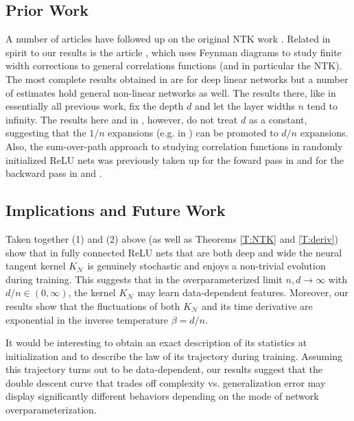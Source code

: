 \documentclass[11pt, reqno]{amsart}
\newcommand{\gives}{\ensuremath{\rightarrow}}
\newcommand{\mN}{\mathcal N}
\begin{document}
\subsection{Prior Work}
A number of articles \cite{bietti2019inductive,dyer2018asymptotics,lee2019wide,yang2019scaling} have followed up on the original NTK work \cite{jacot2018neural}. Related in spirit to our results is the article \cite{dyer2018asymptotics}, which uses Feynman diagrams to study finite width corrections to general correlations functions (and in particular the NTK). The most complete results obtained in \cite{dyer2018asymptotics} are for deep linear networks but a number of estimates hold general non-linear networks as well. The results there, like in essentially all previous work, fix the depth $d$ and let the layer widths $n$ tend to infinity. The results here and in \cite{hanin2018neural, hanin2018products,hanin2018start}, however, do not treat $d$ as a constant, suggesting that the $1/n$ expansions (e.g. in \cite{dyer2018asymptotics}) can be promoted to $d/n$ expansions. Also, the sum-over-path approach to studying correlation functions in randomly initialized ReLU nets was previously taken up for the foward pass in \cite{hanin2018start} and for the backward pass in \cite{hanin2018neural} and \cite{hanin2018products}. 

\subsection{Implications and Future Work} Taken together (1) and (2) above (as well as Theorems \ref{T:NTK} and \ref{T:deriv}) show that in fully connected ReLU nets that are both deep and wide the neural tangent kernel $K_{\mN}$ is genuinely stochastic and enjoys a non-trivial evolution during training. This suggests that in the overparameterized limit $n,d\gives \infty$ with $d/n\in (0,\infty)$, the kernel $K_{\mN}$ may learn data-dependent features. Moreover, our results show that the fluctuations of both $K_{\mN}$ and its time derivative are exponential in the inverse temperature $\beta = d/n.$ 

It would be interesting to obtain an exact description of its statistics at initialization and to describe the law of its trajectory during training. Assuming this trajectory turns out to be data-dependent, our results suggest that the double descent curve \cite{belkin2018reconciling,belkin2019two,spigler2018jamming} that trades off complexity vs. generalization error may display significantly different behaviors depending on the mode of network overparameterization.
\end{document}
